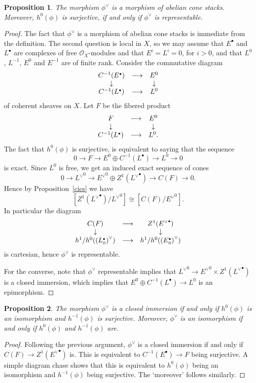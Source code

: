 \documentclass[11pt]{article}
\theoremstyle{plain}
\newtheorem{prop}{Proposition}[section]
\theoremstyle{definition}
\newenvironment{pf}{\begin{proof}}{\end{proof}}
\newcommand{\dual}[1]{{{#1}^{\vee}}}
\newcommand{\fl}{{\mbox{\tiny fl}}}
\newcommand{\com}{^{\scriptscriptstyle\bullet}}
\renewcommand{\O}{{\mathcal{O}}}
\newcommand{\ldiag}[1]
       {\makebox[0cm]{\({\scriptstyle#1}\downarrow\phantom{\scriptstyle#1}\)}}
\newcommand{\rdiag}[1]
       {\makebox[0cm]{\(\phantom{\scriptstyle#1}\downarrow{\scriptstyle#1}\)}}
\newcommand{\comdia}[9]{
\begin{array}{ccc}
#1 & \stackrel{#2}{\longrightarrow} & #3 \\
\ldiag{#4} & #5 & \rdiag{#6} \\
#7 & \stackrel{#8}{\longrightarrow} & #9
\end{array}}
\newcommand{\ses}[5]
{0\longrightarrow#1\stackrel{#2}{ \longrightarrow}#3\stackrel{#4}{
\longrightarrow}#5\longrightarrow0}
\theoremstyle{plain}
\theoremstyle{definition}
\theoremstyle{remark}
\begin{document}
\begin{prop}\label{rmcs}
The morphism \(\dual{\phi}\) is a morphism of abelian cone stacks.
Moreover, \(h^0(\phi)\) is surjective, if and only if \(\dual{\phi}\) is
representable.
\end{prop}
\begin{pf}
The fact that \(\dual{\phi}\) is a morphism of abelian cone stacks is
immediate from the definition. The second question is local in \(X\), so
we may assume that \(E\com\) and \(L\com\) are complexes of free
\(\O_X\)-modules and that \(E^i=L^i=0\), for \(i>0\), and that \(L^0\),
\(L^{-1}\), \(E^0\) and \(E^{-1}\) are of finite rank. Consider the
commutative diagram
\[
\comdia{C^{-1}(E\com)}{}{E^0}{}{}{}{C^{-1}(L\com)}{}{L^0}
\]
of coherent
sheaves on \(X\). Let
\(F\) be the fibered product
\[
\comdia{F}{}{E^0}{}{}{}{C^{-1}(L\com)}{}{L^0.}
\]
The fact that \(h^0(\phi)\) is
surjective, is equivalent to saying that the sequence
\[
\ses{F}{}{E^0\oplus C^{-1}(L\com)}{}{L^0}
\]
is exact. Since \(L^0\) is free, we get an
induced exact sequence of cones
\[
\ses{\dual{L}^0}{}{\dual{E}^0\oplus Z^1(\dual{L}\com)}{}{C(F)}.
\]
Hence
by Proposition~\ref{cics} we have
\[
[Z^1(\dual{L}\com)/\dual{L}^0]\cong[C(F)/\dual{E}^0].
\]
In particular the diagram
\[
\comdia{C(F)}{}{Z^1(\dual{E}\com)}{}{}{}{h^1/h^0(\dual{(L\com_\fl)})}{}
{h^1/h^0(\dual{(E\com_\fl)})}
\]
is cartesian, hence \(\dual{\phi}\) is
representable.

For the converse, note that \(\dual{\phi}\) representable implies that
\(\dual{L}^0\to\dual{E}^0\times Z^1(\dual{L}\com)\) is a closed
immersion, which implies that \(E^0\oplus C^{-1}(L\com)\to L^0\) is an
epimorphism.
\end{pf}

\begin{prop}\label{isoiso}
The morphism \(\dual{\phi}\) is a closed immersion if and only if
\(h^0(\phi)\) is an isomorphism and \(h^{-1}(\phi)\) is surjective.
Moreover, \(\dual{\phi}\) is an isomorphism if and only if \(h^0(\phi)\)
and \(h^{-1}(\phi)\) are.
\end{prop} \begin{pf}
Following the previous argument, \(\dual{\phi}\) is a closed immersion
if and only if \(C(F)\to Z^1(\dual{E}\com)\) is. This is equivalent to
\(C^{-1}(E\com)\to F\) being surjective. A simple diagram chase shows
that this is equivalent to \(h^0(\phi)\) being an isomorphism and
\(h^{-1}(\phi)\) being surjective. The `moreover' follows similarly.
\end{pf}
\end{document}
